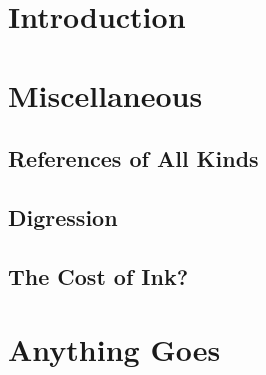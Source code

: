 \documentclass[%
twoside,symmetric,	%
nols, %
a4paper, %
notoc,	%
justified,	%
nobib, %
]{tufte-book} %
\begin{document}
	
	
	
	
	
	\sffamily %
	\tableofcontents
	\normalfont %
	\cleardoublepage
	
	\pagestyle{mystyle}	
	\setcounter{page}{1}
	
	\chapter{Introduction}\label{sec:introduction}
		
		
%			

	\chapter[Miscellaneous]{Miscellaneous}
		
		\cleardoublepage
		\section[References]{References of All Kinds}
			
			\cleardoublepage
		\section[Fonts]{Digression}
			
			\clearpage
		\section[The Cost of Ink?]{The Cost of Ink?}
			
	\chapter[Anything Goes]{Anything Goes}
		
			
	
	\cleardoublepage %
	
	
	\cleardoublepage
	\printindex
\end{document}
